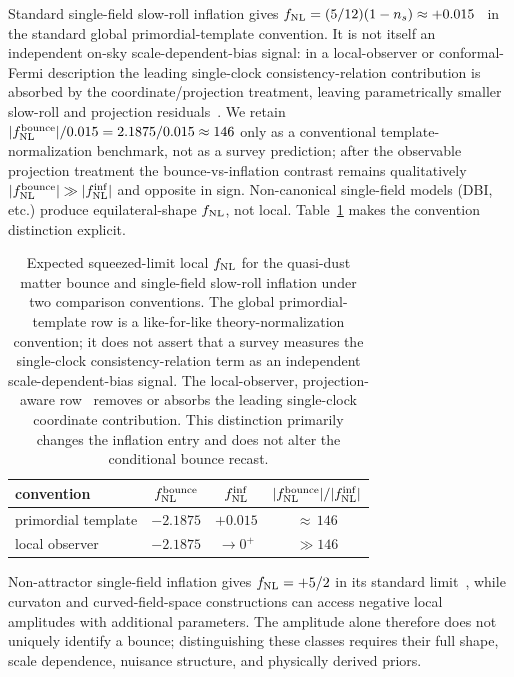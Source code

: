 \documentclass[aps,prd,twocolumn,superscriptaddress,showpacs,preprintnumbers,nofootinbib,longbibliography,floatfix]{revtex4-2}
\newcommand{\fnl}{f_{\rm NL}}
\begin{document}
Standard single-field slow-roll inflation gives $\fnl = (5/12)(1-n_s) \approx +0.015$~\cite{Maldacena:2002vr} in the standard global primordial-template convention. It is not itself an independent on-sky scale-dependent-bias signal: in a local-observer or conformal-Fermi description the leading single-clock consistency-relation contribution is absorbed by the coordinate/projection treatment, leaving parametrically smaller slow-roll and projection residuals~\cite{Pajer:2013,TanakaUrakawa:2011}. We retain $|\fnl^{\rm bounce}|/0.015 = 2.1875/0.015 \approx 146$ only as a conventional template-normalization benchmark, not as a survey prediction; after the observable projection treatment the bounce-vs-inflation contrast remains qualitatively $|\fnl^{\rm bounce}| \gg |\fnl^{\rm inf}|$ and opposite in sign. Non-canonical single-field models (DBI, etc.) produce equilateral-shape $\fnl$, not local. Table~\ref{tab:frames} makes the convention distinction explicit.
\begin{table}[h]
\centering
\caption{\label{tab:frames}Expected squeezed-limit local $\fnl$ for the quasi-dust matter bounce and single-field slow-roll inflation under two comparison conventions. The global primordial-template row is a like-for-like theory-normalization convention; it does not assert that a survey measures the single-clock consistency-relation term as an independent scale-dependent-bias signal. The local-observer, projection-aware row~\cite{Pajer:2013,TanakaUrakawa:2011} removes or absorbs the leading single-clock coordinate contribution. This distinction primarily changes the inflation entry and does not alter the conditional bounce recast.}
\begin{ruledtabular}
\begin{tabular}{lccc}
convention & $\fnl^{\rm bounce}$ & $\fnl^{\rm inf}$ & $|\fnl^{\rm bounce}|/|\fnl^{\rm inf}|$ \\ \hline
primordial template & $-2.1875$ & $+0.015$ & ${\approx}\,146$ \\
local observer & $-2.1875$ & $\to 0^{+}$ & $\gg 146$ \\
\end{tabular}
\end{ruledtabular}
\end{table}

Non-attractor single-field inflation gives $\fnl=+5/2$ in its standard limit~\cite{Cai:2018non}, while curvaton and curved-field-space constructions can access negative local amplitudes with additional parameters. The amplitude alone therefore does not uniquely identify a bounce; distinguishing these classes requires their full shape, scale dependence, nuisance structure, and physically derived priors.
\end{document}
